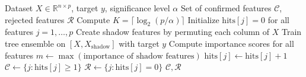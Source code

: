 \documentclass[runningheads]{llncs}
\begin{document}
\begin{algorithm}[t]
\caption{Greedy Boruta Algorithm}
\label{alg:greedy_boruta}
\begin{algorithmic}[1]
\REQUIRE Dataset $X \in \mathbb{R}^{n \times p}$, target $y$, significance level $\alpha$
\ENSURE Set of confirmed features $\mathcal{C}$, rejected features $\mathcal{R}$
\STATE Compute $K = \lceil \log_2(p/\alpha) \rceil$ 
\STATE Initialize $\text{hits}[j] = 0$ for all features $j = 1, \ldots, p$
    \STATE Create shadow features by permuting each column of $X$
    \STATE Train tree ensemble on $[X, X_{\text{shadow}}]$ with target $y$
    \STATE Compute importance scores for all features
    \STATE $m \gets \max(\text{importance of shadow features})$
            \STATE $\text{hits}[j] \gets \text{hits}[j] + 1$
        \ENDIF
    \ENDFOR
\ENDFOR
\STATE $\mathcal{C} \gets \{j : \text{hits}[j] \geq 1\}$ 
\STATE $\mathcal{R} \gets \{j : \text{hits}[j] = 0\}$  
\RETURN $\mathcal{C}, \mathcal{R}$
\end{algorithmic}
\end{algorithm}

\end{document}
